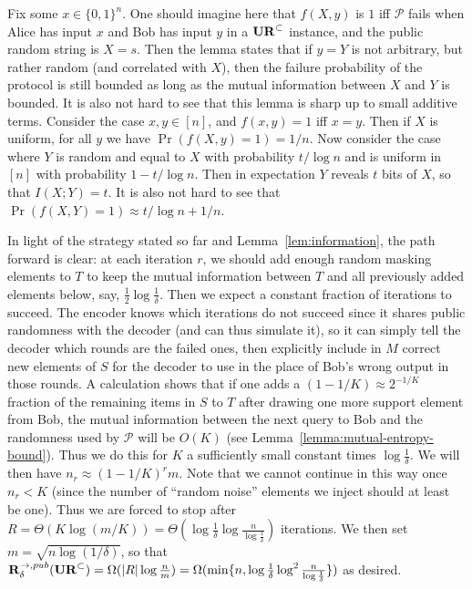 Fix some $x\in\{0,1\}^n$. One should imagine here that $f(X,y)$ is $1$ iff $\mathcal{P}$ fails when Alice has input $x$ and Bob has input $y$ in a $\mathbf{UR}^\subset$ instance, and the public random string is $X=s$. Then the lemma states that if $y=Y$ is not arbitrary, but rather random (and correlated with $X$), then the failure probability of the protocol is still bounded as long as the mutual information between $X$ and $Y$ is bounded. It is also not hard to see that this lemma is sharp up to small additive terms. Consider the case $x,y\in[n]$, and $f(x,y) = 1$ iff $x = y$. Then if $X$ is uniform, for all $y$ we have $\Pr(f(X,y) = 1) = 1/n$. Now consider the case where $Y$ is random and equal to $X$ with probability $t/\log n$ and is uniform in $[n]$ with probability $1 - t/\log n$. Then in expectation $Y$ reveals $t$ bits of $X$, so that $I(X;Y) = t$. It is also not hard to see that $\Pr(f(X,Y) = 1) \approx t/\log n + 1/n$.

In light of the strategy stated so far and Lemma~\ref{lem:information}, the path forward is clear: at each iteration $r$, we should add enough random masking elements to $T$ to keep the mutual information between $T$ and all previously added elements below, say, $\frac 12 \log \frac 1{\delta}$. Then we expect a constant fraction of iterations to succeed. The encoder knows which iterations do not succeed since it shares public randomness with the decoder (and can thus simulate it), so it can simply tell the decoder which rounds are the failed ones, then explicitly include in $M$ correct new elements of $S$ for the decoder to use in the place of Bob's wrong output in those rounds. A calculation shows that if one adds a $(1-1/K)\approx 2^{-1/K}$ fraction of the remaining items in $S$ to $T$ after drawing one more support element from Bob, the mutual information between the next query to Bob and the randomness used by $\mathcal{P}$ will be $O(K)$ (see Lemma~\ref{lemma:mutual-entropy-bound}). Thus we do this for $K$ a sufficiently small constant times $\log \frac 1{\delta}$. We will then have $n_r \approx (1 - 1/K)^r m$. Note that we cannot continue in this way once $n_r < K$ (since the number of ``random noise'' elements we inject should at least be one). Thus we are forced to stop after $R = \Theta(K\log(m/K)) = \Theta(\log\frac 1{\delta} \log\frac n{\log \frac 1{\delta}})$ iterations. We then set $m = \sqrt{n\log(1/\delta)}$, so that $\mathbf{R}^{\rightarrow,pub}_\delta(\mathbf{UR}^\subset) = \Omega(|R|\log \frac nm) = \Omega(\min\{n, \log\frac 1{\delta}\log^2 \frac n{\log \frac 1{\delta}}\})$ as desired.

